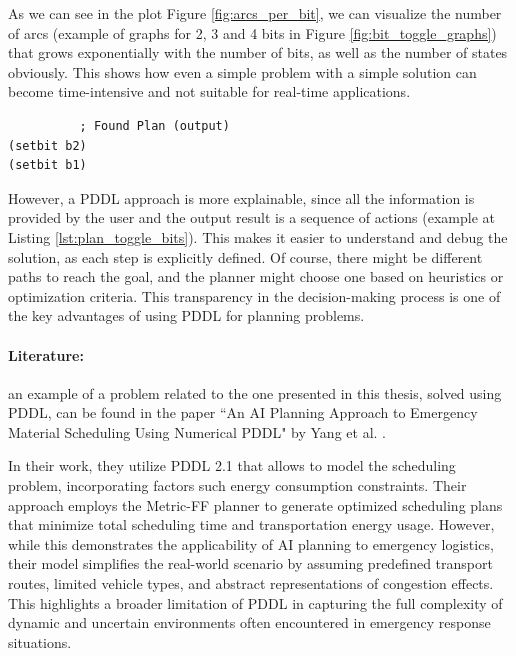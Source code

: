 As we can see in the plot Figure \ref{fig:arcs_per_bit}, we can visualize the number
of arcs (example of graphs for 2, 3 and 4 bits in Figure \ref{fig:bit_toggle_graphs})
that grows exponentially with the number of bits, as well as the number of states
obviously. This shows how even a simple problem with a simple solution can
become time-intensive and not suitable for real-time applications.

\vspace{10mm}
\begin{codewindow}
    \begin{lstlisting}
          ; Found Plan (output)
(setbit b2)
(setbit b1)
\end{lstlisting}
\end{codewindow}
\vspace{10mm}

However, a PDDL approach is more explainable, since all the information is provided
by the user and the output result is a sequence of actions (example at Listing
\ref{lst:plan_toggle_bits}). This makes it easier to understand and debug the
solution, as each step is explicitly defined. Of course, there might be different
paths to reach the goal, and the planner might choose one based on heuristics or
optimization criteria. This transparency in the decision-making process is one of
the key advantages of using PDDL for planning problems.

\paragraph{Literature:}
an example of a problem related to the one presented in this thesis, solved using
PDDL, can be found in the paper ``An AI Planning Approach to Emergency Material
Scheduling Using Numerical PDDL" by Yang et al. \cite{Yang2022}.

In their work, they utilize PDDL 2.1 that allows to model the scheduling problem,
incorporating factors such energy consumption constraints. Their approach employs
the Metric-FF planner to generate optimized scheduling plans that minimize total
scheduling time and transportation energy usage. However, while this demonstrates
the applicability of AI planning to emergency logistics, their model simplifies
the real-world scenario by assuming predefined transport routes, limited vehicle
types, and abstract representations of congestion effects. This highlights a broader
limitation of PDDL in capturing the full complexity of dynamic and uncertain environments
often encountered in emergency response situations.

